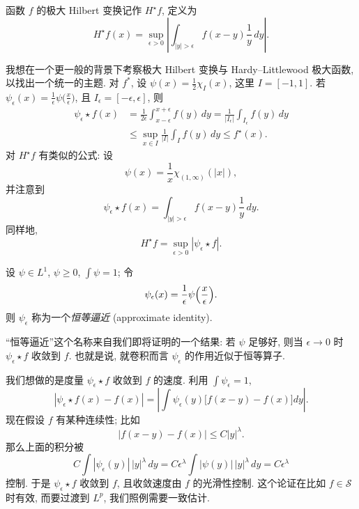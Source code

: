 \begin{definition}\label{def:2.34}
函数 $f$ 的极大 Hilbert 变换记作 $H^{\star}f$, 定义为
\[
H^{\star}f(x)=\sup_{\epsilon>0}\left|\int_{|y|>\epsilon}f(x-y)\frac{1}{y}\,dy\right|.
\]
\end{definition}

\begin{remark}\label{rem:2.35}
我想在一个更一般的背景下考察极大 Hilbert 变换与 Hardy--Littlewood 极大函数, 以找出一个统一的主题. 对 $f^{\ast}$, 设 $\psi(x)=\frac{1}{2}\chi_{I}(x)$, 这里 $I=[-1,1]$. 若 $\psi_{\epsilon}(x)=\frac{1}{\epsilon}\psi\bigl(\frac{x}{\epsilon}\bigr)$, 且 $I_{\epsilon}=[-\epsilon,\epsilon]$, 则
\begin{align*}
\psi_{\epsilon}\star f(x)&=\frac{1}{2\epsilon}\int_{x-\epsilon}^{x+\epsilon}f(y)\,dy
=\frac{1}{|I_{\epsilon}|}\int_{I_{\epsilon}}f(y)\,dy \\
&\leq\sup_{x\in I}\frac{1}{|I|}\int_{I}f(y)\,dy\leq f^{\star}(x).
\end{align*}
对 $H^{\star}f$ 有类似的公式: 设
\[
\psi(x)=\frac{1}{x}\chi_{(1,\infty)}(|x|),
\]
并注意到
\[
\psi_{\epsilon}\star f(x)=\int_{|y|>\epsilon}f(x-y)\frac{1}{y}\,dy.
\]
同样地,
\[
H^{\star}f=\sup_{\epsilon>0}|\psi_{\epsilon}\star f|.
\]
\end{remark}

\begin{definition}\label{def:2.36}
设 $\psi\in L^1$, $\psi\geq 0$, $\int\psi=1$; 令
\[
\psi_{\epsilon}(x)=\frac{1}{\epsilon}\psi\Bigl(\frac{x}{\epsilon}\Bigr).
\]
则 $\psi_{\epsilon}$ 称为一个\emph{恒等逼近} (approximate identity).
\end{definition}

\begin{remark}\label{rem:2.37}
``恒等逼近''这个名称来自我们即将证明的一个结果: 若 $\psi$ 足够好, 则当 $\epsilon\to 0$ 时 $\psi_{\epsilon}\star f$ 收敛到 $f$. 也就是说, 就卷积而言 $\psi_{\epsilon}$ 的作用近似于恒等算子.

我们想做的是度量 $\psi_{\epsilon}\star f$ 收敛到 $f$ 的速度. 利用 $\int\psi_{\epsilon}=1$,
\[
|\psi_{\epsilon}\star f(x)-f(x)|=\left|\int\psi_{\epsilon}(y)\bigl[f(x-y)-f(x)\bigr]dy\right|.
\]
现在假设 $f$ 有某种连续性; 比如
\[
|f(x-y)-f(x)|\leq C|y|^{\lambda}.
\]
那么上面的积分被
\[
C\int|\psi_{\epsilon}(y)|\,|y|^{\lambda}\,dy
=C\epsilon^{\lambda}\int|\psi(y)|\,|y|^{\lambda}\,dy=C\epsilon^{\lambda}
\]
控制. 于是 $\psi_{\epsilon}\star f$ 收敛到 $f$, 且收敛速度由 $f$ 的光滑性控制. 这个论证在比如 $f\in\mathcal{S}$ 时有效, 而要过渡到 $L^{p}$, 我们照例需要一致估计.
\end{remark}

